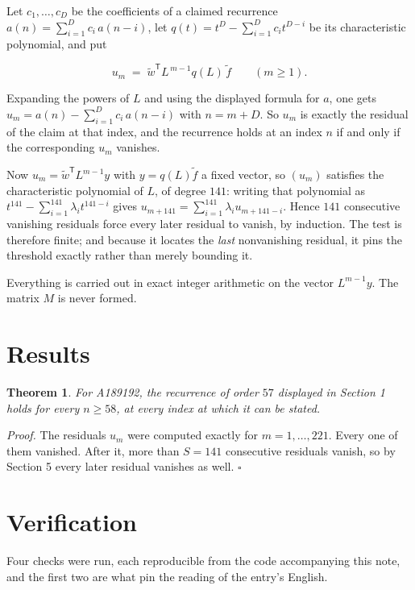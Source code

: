 \documentclass[11pt]{article}
\newtheorem{theorem}{Theorem}
\theoremstyle{definition}
\begin{document}
Let $c_1,\dots,c_D$ be the coefficients of a claimed recurrence $a(n) = \sum_{i=1}^{D} c_i\,a(n-i)$, let $q(t) = t^{D} - \sum_{i=1}^{D} c_i t^{D-i}$ be its characteristic polynomial, and put

\[u_m \;=\; \tilde w^{\mathsf T} L^{\,m-1} q(L)\,\tilde f \qquad (m \ge 1).\]

Expanding the powers of $L$ and using the displayed formula for $a$, one gets $u_m = a(n) - \sum_{i=1}^{D} c_i\,a(n-i)$ with $n = m + D$. So $u_m$ is exactly the residual of the claim at that index, and the recurrence holds at an index $n$ if and only if the corresponding $u_m$ vanishes.

Now $u_m = \tilde w^{\mathsf T} L^{m-1} y$ with $y = q(L)\tilde f$ a fixed vector, so $(u_m)$ satisfies the characteristic polynomial of $L$, of degree $141$: writing that polynomial as $t^{141} - \sum_{i=1}^{141} \lambda_i t^{141-i}$ gives $u_{m+141} = \sum_{i=1}^{141} \lambda_i u_{m+141-i}$. Hence $141$ consecutive vanishing residuals force every later residual to vanish, by induction. The test is therefore finite; and because it locates the {\itshape last} nonvanishing residual, it pins the threshold exactly rather than merely bounding it.

Everything is carried out in exact integer arithmetic on the vector $L^{m-1}y$. The matrix $M$ is never formed.

\section{Results}

\begin{theorem} For A189192, the recurrence of order $57$ displayed in Section 1 holds for every $n \ge 58$, at every index at which it can be stated.\end{theorem}

{\itshape Proof.} The residuals $u_m$ were computed exactly for $m = 1,\dots,221$. Every one of them vanished. After it, more than $S = 141$ consecutive residuals vanish, so by Section 5 every later residual vanishes as well. $\square$

\section{Verification}

Four checks were run, each reproducible from the code accompanying this note, and the first two are what pin the reading of the entry's English.
\end{document}
